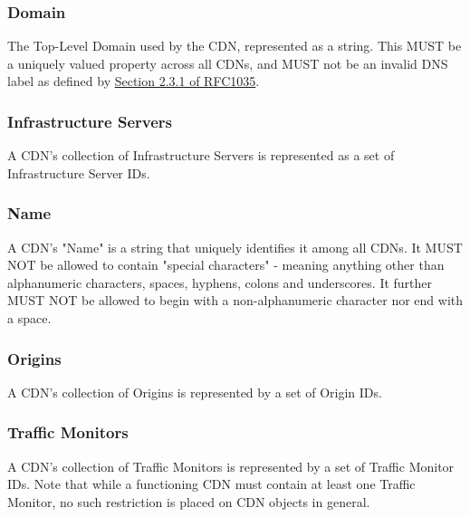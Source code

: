 
\subsubsection{Domain}
The Top-Level Domain used by the CDN, represented as a string. This MUST be a
uniquely valued property across all CDNs, and MUST not be an invalid DNS label
as defined by
\href{https://tools.ietf.org/html/rfc1035#section-2.3.1}{Section 2.3.1 of RFC1035}.

\subsubsection{Infrastructure Servers}
A CDN's collection of Infrastructure Servers is represented as a set of
Infrastructure Server IDs.

\subsubsection{Name}
A CDN's "Name" is a string that uniquely identifies it among all CDNs. It MUST
NOT be allowed to contain "special characters" - meaning anything other than
alphanumeric characters, spaces, hyphens, colons and underscores. It further
MUST NOT be allowed to begin with a non-alphanumeric character nor end with a
space.

\subsubsection{Origins}
A CDN's collection of Origins is represented by a set of Origin IDs.

\subsubsection{Traffic Monitors}
A CDN's collection of Traffic Monitors is represented by a set of Traffic
Monitor IDs. Note that while a functioning CDN must contain at least one Traffic
Monitor, no such restriction is placed on CDN objects in general.

